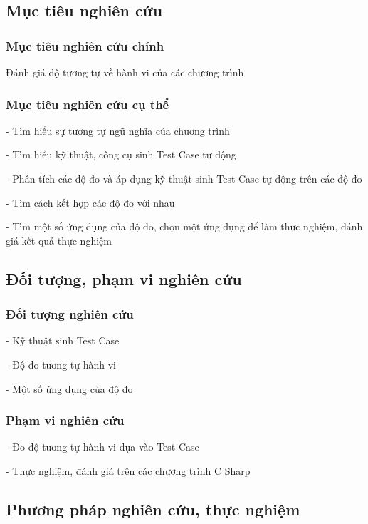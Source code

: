 \subsection*{Mục tiêu nghiên cứu}

\subsubsection*{Mục tiêu nghiên cứu chính}
Đánh giá độ tương tự về hành vi của các chương trình

\subsubsection*{Mục tiêu nghiên cứu cụ thể}

- Tìm hiểu sự tương tự ngữ nghĩa của chương trình

- Tìm hiểu kỹ thuật, công cụ sinh Test Case tự động

- Phân tích các độ đo và áp dụng kỹ thuật sinh Test Case tự động trên các độ đo

- Tìm cách kết hợp các độ đo với nhau

- Tìm một số ứng dụng của độ đo, chọn một ứng dụng để làm thực nghiệm, đánh giá kết quả thực nghiệm

\subsection*{Đối tượng, phạm vi nghiên cứu}

\subsubsection*{Đối tượng nghiên cứu}

- Kỹ thuật sinh Test Case

- Độ đo tương tự hành vi

- Một số ứng dụng của độ đo

\subsubsection*{Phạm vi nghiên cứu}

- Đo độ tương tự hành vi dựa vào Test Case

- Thực nghiệm, đánh giá trên các chương trình C Sharp



\subsection*{Phương pháp nghiên cứu, thực nghiệm}

